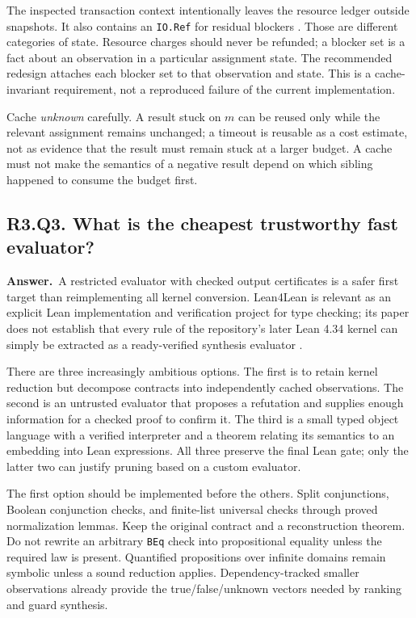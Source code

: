 \documentclass[11pt,a4paper]{article}
\theoremstyle{definition}
\theoremstyle{remark}
\newcommand{\code}[1]{\texttt{#1}}
\newcommand{\answer}{\par\noindent\textbf{Answer.}\ }
\newcommand{\qheading}[2]{\subsection{#1. #2}}
\begin{document}
The inspected transaction context intentionally leaves the resource ledger
outside snapshots. It also contains an \code{IO.Ref} for residual blockers
\cite{srctrans}. Those are different categories of state. Resource charges
should never be refunded; a blocker set is a fact about an observation in a
particular assignment state. The recommended redesign attaches each blocker
set to that observation and state. This is a cache-invariant requirement, not
a reproduced failure of the current implementation.

Cache \emph{unknown} carefully. A result stuck on $m$ can be reused only while
the relevant assignment remains unchanged; a timeout is reusable as a cost
estimate, not as evidence that the result must remain stuck at a larger budget.
A cache must not make the semantics of a negative result depend on which
sibling happened to consume the budget first.

\qheading{R3.Q3}{What is the cheapest trustworthy fast evaluator?}
\answer A restricted evaluator with checked output certificates is a safer
first target than reimplementing all kernel conversion. Lean4Lean is relevant
as an explicit Lean implementation and verification project for type checking;
its paper does not establish that every rule of the repository's later
Lean 4.34 kernel can simply be extracted as a ready-verified synthesis evaluator
\cite{lean4lean}.

There are three increasingly ambitious options. The first is to retain kernel
reduction but decompose contracts into independently cached observations. The
second is an untrusted evaluator that proposes a refutation and supplies enough
information for a checked proof to confirm it. The third is a small typed
object language with a verified interpreter and a theorem relating its
semantics to an embedding into Lean expressions. All three preserve the final
Lean gate; only the latter two can justify pruning based on a custom evaluator.

The first option should be implemented before the others. Split conjunctions,
Boolean conjunction checks, and finite-list universal checks through proved
normalization lemmas. Keep the original contract and a reconstruction theorem.
Do not rewrite an arbitrary \code{BEq} check into propositional equality unless
the required law is present. Quantified propositions over infinite domains
remain symbolic unless a sound reduction applies. Dependency-tracked smaller
observations already provide the true/false/unknown vectors needed by ranking
and guard synthesis.
\end{document}
